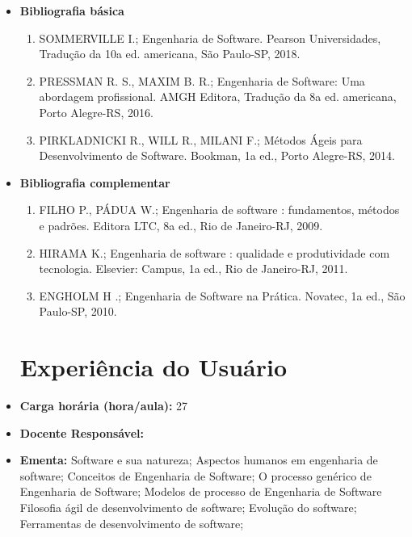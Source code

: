 \documentclass[11pt,fleqn]{book} %
\begin{document}
\begin{itemize}
	\item \textbf{Bibliografia básica}
	\begin{enumerate}
		\item SOMMERVILLE I.; Engenharia de Software. Pearson Universidades, Tradução da 10a ed. americana, São Paulo-SP, 2018.
		\item PRESSMAN R. S., MAXIM B. R.; Engenharia de Software: Uma abordagem profissional. AMGH Editora, Tradução da 8a ed. americana, Porto Alegre-RS, 2016.
		\item PIRKLADNICKI R., WILL R., MILANI F.; Métodos Ágeis para Desenvolvimento de Software. Bookman, 1a ed., Porto Alegre-RS, 2014.
	\end{enumerate}
	\item \textbf{Bibliografia complementar}
	\begin{enumerate}
		\item FILHO P., PÁDUA W.; Engenharia de software : fundamentos, métodos e padrões. Editora LTC, 8a ed., Rio de Janeiro-RJ, 2009.
		\item HIRAMA K.; Engenharia de software : qualidade e produtividade com tecnologia. Elsevier: Campus, 1a ed., Rio de Janeiro-RJ, 2011.
		\item ENGHOLM H .; Engenharia de Software na Prática. Novatec, 1a ed., São Paulo-SP, 2010.
	
	\end{enumerate}
	
\newpage
\section{Experiência do Usuário}\label{disc:engenharia_de_requisitos}
	
	\item \textbf{Carga horária (hora/aula):} 27
	\item \textbf{Docente Responsável:}~
	\item \textbf{Ementa:} 
    Software e sua natureza;
    Aspectos humanos em engenharia de software;
	Conceitos de Engenharia de Software;
	O processo genérico de Engenharia de Software;
	Modelos de processo de Engenharia de Software
	Filosofia ágil de desenvolvimento de software;
    Evolução do software;
    Ferramentas de desenvolvimento de software;
	

\end{itemize}
\end{document}
